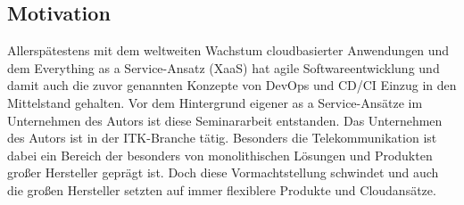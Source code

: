 \subsection{Motivation}
\label{Motivation}
Allerspätestens mit dem weltweiten Wachstum cloudbasierter Anwendungen und dem \glqq{}Everything as a Service\grqq{}-Ansatz (\acrshort{XaaS}) hat agile Softwareentwicklung und damit auch die zuvor genannten Konzepte von \gls{DevOps} und \acrshort{CD}/\acrshort{CI} Einzug in den Mittelstand gehalten. Vor dem Hintergrund eigener \glqq{}as a Service\grqq{}-Ansätze im Unternehmen des Autors ist diese Seminararbeit entstanden. Das Unternehmen des Autors ist in der \acrshort{ITK}-Branche tätig. Besonders die Telekommunikation ist dabei ein Bereich der besonders von monolithischen Lösungen und Produkten großer Hersteller geprägt ist.  Doch diese Vormachtstellung schwindet und auch die großen Hersteller setzten auf immer flexiblere Produkte und Cloudansätze.
